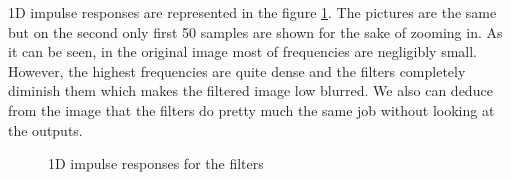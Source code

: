 \documentclass[a4paper]{article}
\begin{document}
1D impulse responses are represented in the figure \ref{impulse_responses}. The pictures are the same but on the second only first 50 samples are shown for the sake of zooming in. As it can be seen, in the original image most of frequencies are negligibly small. However, the highest frequencies are quite dense and the filters completely diminish them which makes the filtered image low blurred. We also can deduce from the image that the filters do pretty much the same job without looking at the outputs.
\begin{figure}[!htb]\centering
\begin{minipage}{0.49\textwidth}  \end{minipage}
\begin{minipage}{0.49\textwidth}  \end{minipage}
\caption{1D impulse responses for the filters}
\label{impulse_responses}
\end{figure}
\end{document}
